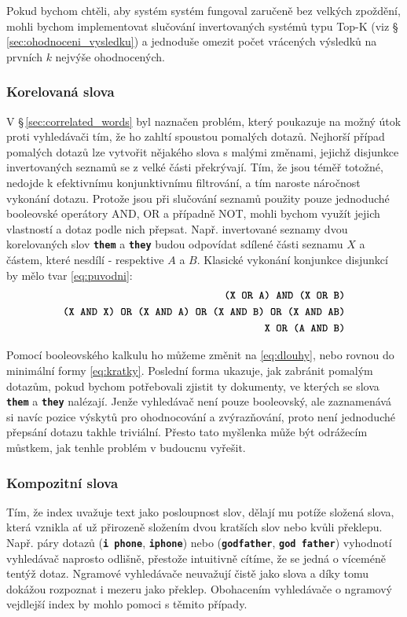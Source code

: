 \documentclass[11pt,letterpaper,oneside,openright]{book}
\newcommand{\bftt}[1]{\texttt{\textbf{#1}}}
\begin{document}
Pokud bychom chtěli, aby systém systém fungoval zaručeně bez velkých zpoždění,
mohli bychom implementovat slučování invertovaných systémů typu Top-K (viz
\S\,\ref{sec:ohodnoceni_vysledku}) a jednoduše omezit počet vrácených výsledků
na prvních $k$ nejvýše ohodnocených.

\subsubsection{Korelovaná slova}
V \S\,\ref{sec:correlated_words} byl naznačen problém, který poukazuje na možný
útok proti vyhledávači tím, že ho zahltí spoustou pomalých dotazů. Nejhorší
případ pomalých dotazů lze vytvořit nějakého slova s malými změnami, jejichž
disjunkce invertovaných seznamů se z velké části překrývají. Tím, že jsou téměř
totožné, nedojde k efektivnímu konjunktivnímu filtrování, a tím naroste
náročnost vykonání dotazu. Protože jsou při slučování seznamů použity pouze
jednoduché booleovské operátory AND, OR a případně NOT, mohli bychom využít
jejich vlastností a dotaz podle nich přepsat. Např. invertované seznamy dvou
korelovaných slov \bftt{them} a \bftt{they} budou odpovídat sdílené části
seznamu $X$ a částem, které nesdílí - respektive $A$ a $B$. Klasické vykonání
konjunkce disjunkcí by mělo tvar \ref{eq:puvodni}:
\begin{align}
\bftt{(X OR A) AND (X OR B)} \label{eq:puvodni} \\
\bftt{(X AND X) OR (X AND A) OR (X AND B) OR (X AND AB)} \label{eq:dlouhy} \\
\bftt{X OR (A AND B)} \label{eq:kratky}
\end{align}

Pomocí booleovského kalkulu ho můžeme změnit na \ref{eq:dlouhy}, nebo rovnou do
minimální formy \ref{eq:kratky}. Poslední forma ukazuje, jak zabránit pomalým
dotazům, pokud bychom potřebovali zjistit ty dokumenty, ve kterých se slova
\bftt{them} a \bftt{they} nalézají. Jenže vyhledávač není pouze booleovský, ale
zaznamenává si navíc pozice výskytů pro ohodnocování a zvýrazňování, proto není
jednoduché přepsání dotazu takhle triviální. Přesto tato myšlenka může být
odrážecím můstkem, jak tenhle problém v budoucnu vyřešit.

\subsubsection{Kompozitní slova}
Tím, že index uvažuje text jako posloupnost slov, dělají mu potíže složená
slova, která vznikla ať už přirozeně složením dvou kratších slov nebo kvůli
překlepu. Např. páry dotazů (\bftt{i phone}, \bftt{iphone}) nebo
(\bftt{godfather}, \bftt{god father}) vyhodnotí vyhledávač naprosto odlišně,
přestože intuitivně cítíme, že se jedná o víceméně tentýž dotaz. Ngramové
vyhledávače neuvažují čistě jako slova a díky tomu dokážou rozpoznat i mezeru
jako překlep. Obohacením vyhledávače o ngramový vejdlejší index by mohlo pomoci
s těmito případy.
\end{document}
